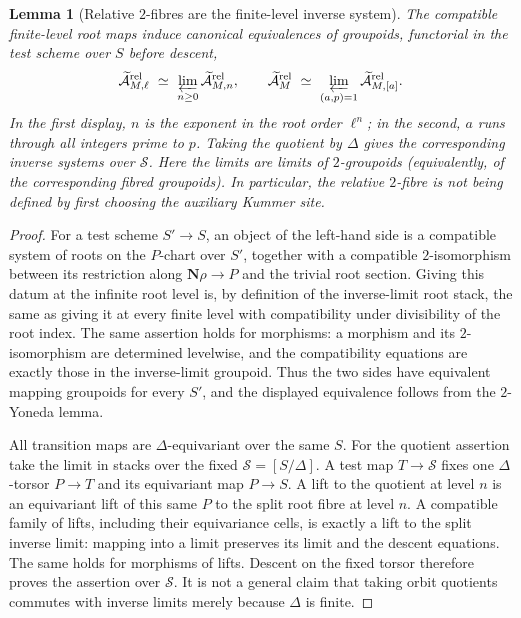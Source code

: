 \documentclass[11pt]{article}
\newtheorem{lemma}[theorem]{Lemma}
\theoremstyle{definition}
\theoremstyle{remark}
\begin{document}
\begin{lemma}[Relative $2$-fibres are the finite-level inverse system]
\label{lem:frag-relative-fibre-limit}
The compatible finite-level root maps induce canonical equivalences of
groupoids, functorial in the test scheme over $S$ before descent,
\[
 \widetilde{\mathcal A}_{M,\ell}^{\mathrm{rel}}
 \ \simeq\ \varprojlim_{n\geq 0}
       \widetilde{\mathcal A}_{M,n}^{\mathrm{rel}},
\qquad
 \widetilde{\mathcal A}_{M}^{\mathrm{rel}}
 \ \simeq\ \varprojlim_{(a,p)=1}
                  \widetilde{\mathcal A}_{M,[a]}^{\mathrm{rel}}.
\]
In the first display, $n$ is the exponent in the root order $\ell^n$; in the
second, $a$ runs through all integers prime to $p$.  Taking the quotient
by $\Delta$ gives the corresponding inverse systems over $\mathscr S$.
Here the limits are limits of $2$-groupoids (equivalently, of the
corresponding fibred groupoids).  In particular, the relative $2$-fibre is not
being defined by first choosing the auxiliary Kummer site.
\end{lemma}

\begin{proof}
For a test scheme $S'\to S$, an object of the left-hand side is a compatible
system of roots on the $P$-chart over $S'$, together with a compatible
$2$-isomorphism between its restriction along $\mathbf N\rho\to P$ and the
trivial root section.  Giving this datum at the infinite root level is, by
definition of the inverse-limit root stack, the same as giving it at every
finite level with compatibility under divisibility of the root index.  The
same assertion holds for morphisms: a morphism and its $2$-isomorphism are
determined levelwise, and the compatibility equations are exactly those in
the inverse-limit groupoid.  Thus the two sides have equivalent mapping
groupoids for every $S'$, and the displayed equivalence follows from the
$2$-Yoneda lemma.

All transition maps are $\Delta$-equivariant over the same $S$.
For the quotient assertion take the limit in stacks over the fixed
$\mathscr S=[S/\Delta]$.  A test map $T\to\mathscr S$ fixes one
$\Delta$-torsor $P\to T$ and its equivariant map $P\to S$.
A lift to the quotient at level $n$ is an equivariant lift of this
same $P$ to the split root fibre at level $n$.  A compatible family
of lifts, including their equivariance cells, is exactly a lift to
the split inverse limit: mapping into a limit preserves its limit
and the descent equations.  The same holds for morphisms of lifts.
Descent on the fixed torsor therefore proves the assertion over
$\mathscr S$.  It is not a general claim that taking orbit quotients
commutes with inverse limits merely because $\Delta$ is finite.
\end{proof}
\end{document}
